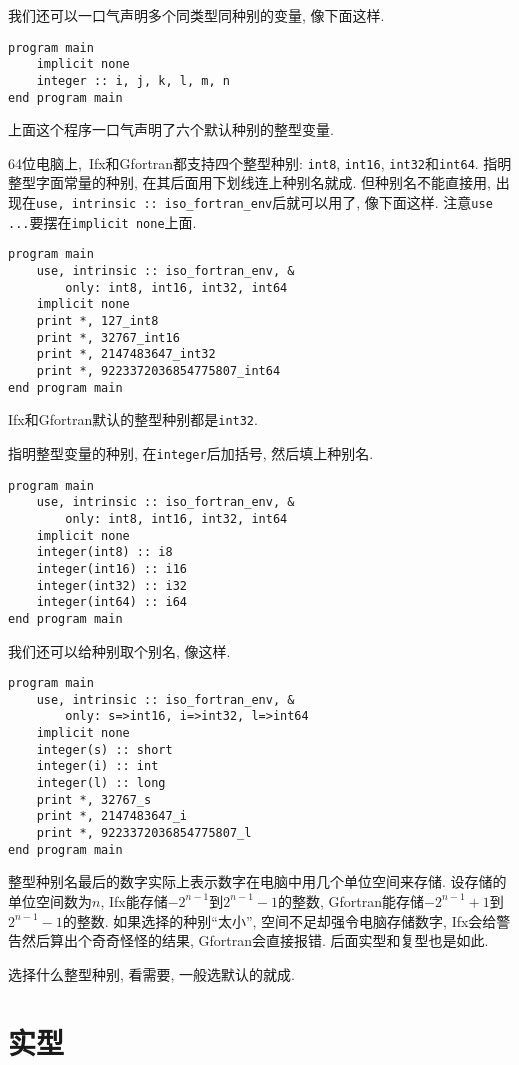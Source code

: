 我们还可以一口气声明多个同类型同种别的变量, 像下面这样.
\begin{lstlisting}
program main
    implicit none
    integer :: i, j, k, l, m, n
end program main
\end{lstlisting}

上面这个程序一口气声明了六个默认种别的整型变量.

64位电脑上,~Ifx和Gfortran都支持四个整型种别: \texttt{int8}, \texttt{int16}, \texttt{int32}和\texttt{int64}. 指明整型字面常量的种别, 在其后面用下划线连上种别名就成. 但种别名不能直接用, 出现在\texttt{use, intrinsic :: iso\_{}fortran\_{}env}后就可以用了, 像下面这样. 注意\texttt{use ...}要摆在\texttt{implicit none}上面.
\begin{lstlisting}
program main
    use, intrinsic :: iso_fortran_env, &
        only: int8, int16, int32, int64
    implicit none
    print *, 127_int8
    print *, 32767_int16
    print *, 2147483647_int32
    print *, 9223372036854775807_int64
end program main
\end{lstlisting}

Ifx和Gfortran默认的整型种别都是\texttt{int32}.

指明整型变量的种别, 在\texttt{integer}后加括号, 然后填上种别名.
\begin{lstlisting}
program main
    use, intrinsic :: iso_fortran_env, &
        only: int8, int16, int32, int64
    implicit none
    integer(int8) :: i8
    integer(int16) :: i16
    integer(int32) :: i32
    integer(int64) :: i64
end program main
\end{lstlisting}

我们还可以给种别取个别名, 像这样.
\begin{lstlisting}
program main
    use, intrinsic :: iso_fortran_env, &
        only: s=>int16, i=>int32, l=>int64
    implicit none
    integer(s) :: short
    integer(i) :: int
    integer(l) :: long
    print *, 32767_s
    print *, 2147483647_i
    print *, 9223372036854775807_l
end program main
\end{lstlisting}

整型种别名最后的数字实际上表示数字在电脑中用几个单位空间来存储. 设存储的单位空间数为$n$, Ifx能存储$-2^{n-1}$到$2^{n-1}-1$的整数, Gfortran能存储$-2^{n-1}+1$到$2^{n-1}-1$的整数. 如果选择的种别``太小'', 空间不足却强令电脑存储数字, Ifx会给警告然后算出个奇奇怪怪的结果, Gfortran会直接报错. 后面实型和复型也是如此.

选择什么整型种别, 看需要, 一般选默认的就成.

\section{实型}

